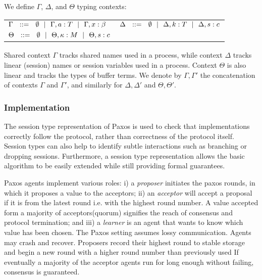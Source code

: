 %


%
%

\begin{definition}
	We define $\Gamma$, $\Delta$, and $\Theta$ typing contexts:\\
	\begin{tabular}{l}
		$\Gamma \ \ ::=\ \  \emptyset \ \ |\ \  \Gamma, a: T \ \ |\ \  \Gamma, x: \beta
		\qquad
		\Delta \ \ ::=\ \  \emptyset \ \ |\ \  \Delta, k: T \ \ |\ \  \Delta, s: c
		$
		\\
		$\Theta \ \ ::=\ \  \emptyset \ \ |\ \  \Theta, \kappa: M \ \ |\ \  \Theta, s: c$
	\end{tabular}
\end{definition}


%
Shared context $\Gamma$ tracks shared names used in a process,
while context $\Delta$ tracks linear (session) names or session variables
used in a process.
Context $\Theta$ is also linear and tracks the types of buffer terms.
We denote by $\Gamma, \Gamma'$ the concatenation of contexts $\Gamma$ and
$\Gamma'$, and similarly for $\Delta,\Delta'$ and $\Theta, \Theta'$.
%


\subsubsection{Implementation}

The session type representation of Paxos is used to check that implementations
correctly follow the protocol, rather than correctness of the protocol itself.
Session types can also help to identify subtle interactions such as branching or dropping sessions.
Furthermore, a session type representation allows the basic algorithm to be easily extended while
still providing formal guarantees.

Paxos agents implement various roles:
i) a \emph{proposer} initiates the paxos rounds,
in which it proposes a value to the acceptors;
ii) an \emph{acceptor} will accept a proposal if it is from the latest round i.e. with the highest round number.
A value accepted form a  majority of acceptors(quorum) signifies the reach of consensus and protocol termination; and
iii) a \emph{learner} is an agent that wants to know which value has been chosen.
%
The Paxos setting assumes lossy communication. Agents may crash and
recover.
Proposers record their highest round to stable storage and begin a new
round with a higher round number than previously used%
If eventually a majority of the acceptor agents run for long enough without failing, consensus is guaranteed.

